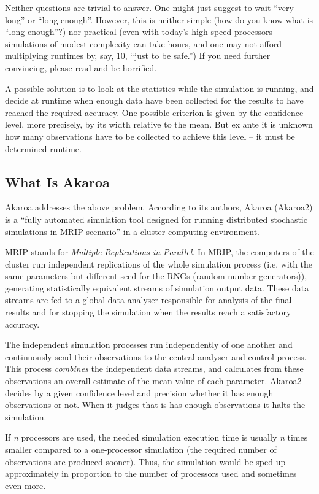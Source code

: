 Neither questions are trivial to answer. One might just suggest
to wait ``very long'' or ``long enough''. However, this is neither
simple (how do you know what is ``long enough''?) nor practical
(even with today's high speed processors simulations of modest complexity
can take hours, and one may not afford multiplying runtimes by,
say, 10, ``just to be safe.'') If you need further convincing,
please read \cite{Pawlikowsky02} and be horrified.

A possible solution is to look at the statistics while the simulation
is running, and decide at runtime when enough data have been
collected for the results to have reached the required accuracy.
One possible criterion is given by the confidence level,
more precisely, by its width relative to the mean.
But ex ante it is unknown how many observations have to be collected
to achieve this level -- it must be determined runtime.


\subsection{What Is Akaroa}

Akaroa \cite{Akaroa99} addresses the above problem.
According to its authors, Akaroa (Akaroa2) is a ``fully automated
simulation tool designed for running distributed stochastic simulations
in MRIP scenario'' in a cluster computing environment.

MRIP stands for \textit{Multiple Replications in Parallel}.
In MRIP, the computers of the cluster run independent replications
of the whole simulation process (i.e. with the same parameters but
different seed for the RNGs (random number generators)),
generating statistically equivalent streams of simulation output data.
These data streams are fed to a global data analyser responsible for
analysis of the final results and for stopping the simulation
when the results reach a satisfactory accuracy.

The independent simulation processes run independently of one another
and continuously send their observations to the central analyser
and control process. This process \textit{combines} the independent data streams,
and calculates from these observations an overall estimate of the mean value
of each parameter.
Akaroa2 decides by a given confidence level and precision
whether it has enough observations or not. When it judges that is
has enough observations it halts the simulation.

If \textit{n} processors are used, the needed simulation execution time
is usually \textit{n} times smaller compared to a one-processor
simulation (the required number of observations are produced sooner).
Thus, the simulation would be sped up approximately in proportion
to the number of processors used and sometimes even more.

